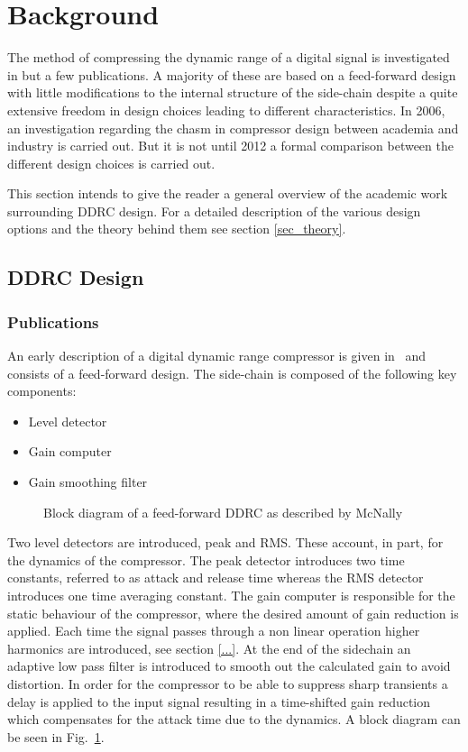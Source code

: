 \documentclass[../main2.tex]{subfiles}
\providecommand{\rootdir}{..}
\begin{document}
\section{Background} \label{background}
The method of compressing the dynamic range of a digital signal is investigated in but a few publications. A majority of these are based on a feed-forward design with little modifications to the internal structure of the side-chain despite a quite extensive freedom in design choices leading to different characteristics.  In 2006, an investigation regarding the chasm in compressor design between academia and industry is carried out. But it is not until 2012 a formal comparison between the different design choices is carried out.

This section intends to give the reader a general overview of the academic work surrounding DDRC design. For a detailed description of the various design options and the theory behind them see section \ref{sec_theory}.

\FloatBarrier
\subsection{DDRC Design}
\subsubsection{Publications}
An early description of a digital dynamic range compressor is given in~\cite{mcnally1984dynamic} and consists of a feed-forward  design. The side-chain is composed of the following key components:
\begin{itemize}
\item{Level detector}
\item{Gain computer}
\item{Gain smoothing filter}
\end{itemize}
\begin{figure}
\centerline{}
\caption{Block diagram of a feed-forward DDRC as described by McNally}
\label{fig:block_mcnally}
\end{figure}
Two level detectors are introduced, peak and RMS. These account, in part, for the dynamics of the compressor. The peak detector introduces two time constants, referred to as attack and release time whereas the RMS detector introduces one time averaging constant. The gain computer is responsible for the static behaviour of the compressor, where the desired amount of gain reduction is applied. Each time the signal passes through a non linear operation higher harmonics are introduced,  see section \ref{...}. At the end of the sidechain an adaptive low pass filter is introduced to smooth out the calculated gain to avoid distortion. In order for the compressor to be able to suppress sharp transients a delay is applied to the input signal resulting in a time-shifted gain reduction which compensates for the attack time due to the dynamics. A block diagram can be seen in Fig.~\ref{fig:block_mcnally}.
\end{document}
